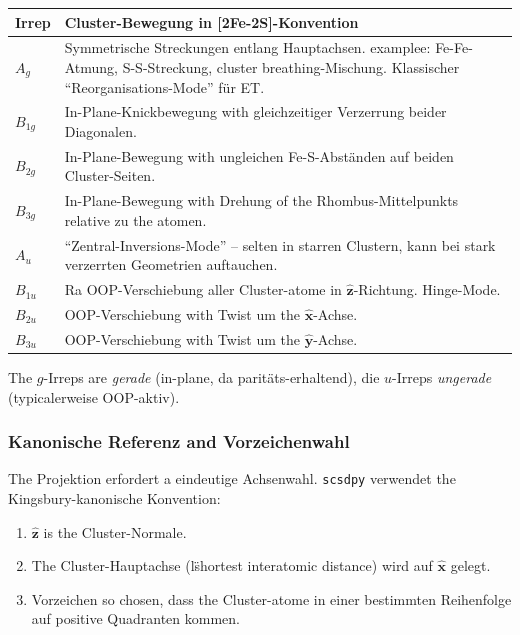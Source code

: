 \documentclass[11pt,a4paper,twoside]{article}
\newcommand{\xhat}{\hat{\mathbf{x}}}
\newcommand{\zhat}{\hat{\mathbf{z}}}
\theoremstyle{remark}
\begin{document}
\begin{center}
\begin{tabular}{lp{8.5cm}}
  \toprule
  \textbf{Irrep} & \textbf{Cluster-Bewegung in [2Fe-2S]-Konvention} \\
  \midrule
  $A_g$    & Symmetrische Streckungen entlang Hauptachsen.
             examplee: Fe-Fe-Atmung, S-S-Streckung,
             cluster breathing-Mischung. Klassischer
             "`Reorganisations-Mode"' f\"ur ET. \\
  $B_{1g}$ & In-Plane-Knickbewegung with gleichzeitiger Verzerrung
             beider Diagonalen. \\
  $B_{2g}$ & In-Plane-Bewegung with ungleichen Fe-S-Abst\"anden auf
             beiden Cluster-Seiten. \\
  $B_{3g}$ & In-Plane-Bewegung with Drehung of the Rhombus-Mittelpunkts
             relative zu the atomen. \\
  $A_u$    & "`Zentral-Inversions-Mode"' -- selten in starren
             Clustern, kann bei stark verzerrten Geometrien
             auftauchen. \\
  $B_{1u}$ & Ra OOP-Verschiebung aller Cluster-atome in
             $\hat{\mathbf{z}}$-Richtung. Hinge-Mode. \\
  $B_{2u}$ & OOP-Verschiebung with Twist um the $\hat{\mathbf{x}}$-Achse. \\
  $B_{3u}$ & OOP-Verschiebung with Twist um the $\hat{\mathbf{y}}$-Achse. \\
  \bottomrule
\end{tabular}
\end{center}

The $g$-Irreps are \emph{gerade} (in-plane, da paritäts-erhaltend),
die $u$-Irreps \emph{ungerade} (typicalerweise OOP-aktiv).

\subsubsection*{Kanonische Referenz and Vorzeichenwahl}

The Projektion erfordert a eindeutige Achsenwahl. \texttt{scsdpy}
verwendet the Kingsbury-kanonische Konvention:

\begin{enumerate}
  \item $\zhat$ is the Cluster-Normale.
  \item The Cluster-Hauptachse (l\"shortest interatomic distance) wird
        auf $\xhat$ gelegt.
  \item Vorzeichen so chosen, dass the Cluster-atome in einer
        bestimmten Reihenfolge auf positive Quadranten kommen.
\end{enumerate}
\end{document}
